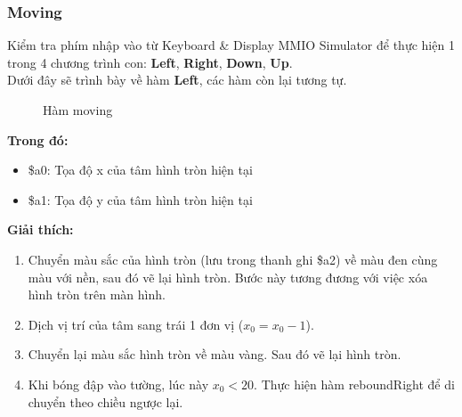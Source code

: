 \documentclass[a4paper,12pt]{article}
\begin{document}
    \subsubsection{Moving}
    Kiểm tra phím nhập vào từ Keyboard \& Display MMIO Simulator để thực hiện 1 trong 4 chương trình con: \textbf{Left}, \textbf{Right}, \textbf{Down}, \textbf{Up}. \\
    Dưới đây sẽ trình bày về hàm \textbf{Left}, các hàm còn lại tương tự. \\
    \FloatBarrier
    \begin{figure}[ht!]
    	\centerline{}
    	\caption{Hàm moving}
    	\label{fig:bai6}
    \end{figure}
    \noindent
    \textbf{Trong đó:}
    \begin{itemize}
        \item \$a0: Tọa độ x của tâm hình tròn hiện tại
        \item \$a1: Tọa độ y của tâm hình tròn hiện tại
    \end{itemize}
    \textbf{Giải thích:}
    \begin{enumerate}
        \item Chuyển màu sắc của hình tròn (lưu trong thanh ghi \$a2) về màu đen cùng màu với nền, sau đó vẽ lại hình tròn. Bước này tương đương với việc xóa hình tròn trên màn hình.
        \item Dịch vị trí của tâm sang trái 1 đơn vị ($x_0 = x_0 - 1$).
        \item Chuyển lại màu sắc hình tròn về màu vàng. Sau đó vẽ lại hình tròn.
        \item Khi bóng đập vào tường, lúc này $x_0 < 20$. Thực hiện hàm reboundRight để di chuyển theo chiều ngược lại. 
    \end{enumerate}
\end{document}
